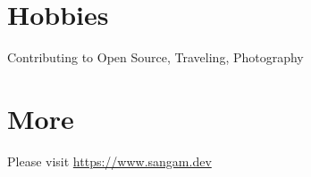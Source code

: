 \documentclass[margin, centered]{res}
\begin{document}
\begin{resume}
    \section{Hobbies}
    Contributing to Open Source, Traveling, Photography

    \section{More}
    Please visit \href{https://www.sangam.dev}{https://www.sangam.dev}

\end{resume}
\end{document}
